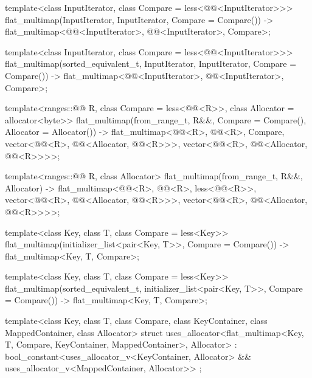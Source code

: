\begin{codeblock}
{  template<class InputIterator, class Compare = less<@@<InputIterator>>>
    flat_multimap(InputIterator, InputIterator, Compare = Compare())
      -> flat_multimap<@@<InputIterator>, @@<InputIterator>, Compare>;

  template<class InputIterator, class Compare = less<@@<InputIterator>>>
    flat_multimap(sorted_equivalent_t, InputIterator, InputIterator, Compare = Compare())
      -> flat_multimap<@@<InputIterator>, @@<InputIterator>, Compare>;

  template<ranges::@@ R, class Compare = less<@@<R>>,
           class Allocator = allocator<byte>>
    flat_multimap(from_range_t, R&&, Compare = Compare(), Allocator = Allocator())
      -> flat_multimap<@@<R>, @@<R>, Compare,
                       vector<@@<R>,
                              @@<Allocator, @@<R>>>,
                       vector<@@<R>,
                              @@<Allocator, @@<R>>>>;

  template<ranges::@@ R, class Allocator>
    flat_multimap(from_range_t, R&&, Allocator)
      -> flat_multimap<@@<R>, @@<R>, less<@@<R>>,
                       vector<@@<R>,
                              @@<Allocator, @@<R>>>,
                       vector<@@<R>,
                              @@<Allocator, @@<R>>>>;

  template<class Key, class T, class Compare = less<Key>>
    flat_multimap(initializer_list<pair<Key, T>>, Compare = Compare())
      -> flat_multimap<Key, T, Compare>;

  template<class Key, class T, class Compare = less<Key>>
    flat_multimap(sorted_equivalent_t, initializer_list<pair<Key, T>>, Compare = Compare())
        -> flat_multimap<Key, T, Compare>;

  template<class Key, class T, class Compare, class KeyContainer, class MappedContainer,
            class Allocator>
    struct uses_allocator<flat_multimap<Key, T, Compare, KeyContainer, MappedContainer>,
                          Allocator>
      : bool_constant<uses_allocator_v<KeyContainer, Allocator> &&
                      uses_allocator_v<MappedContainer, Allocator>> { };
}
\end{codeblock}

